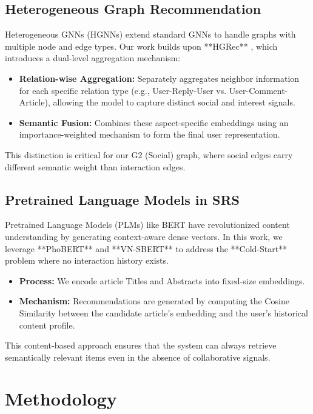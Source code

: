 \documentclass[11pt]{article}
\begin{document}
\subsection{Heterogeneous Graph Recommendation}
Heterogeneous GNNs (HGNNs) extend standard GNNs to handle graphs with multiple node and edge types. Our work builds upon **HGRec** \citet{shi2020hgrec}, which introduces a dual-level aggregation mechanism:
\begin{itemize}
  \item \textbf{Relation-wise Aggregation:} Separately aggregates neighbor information for each specific relation type (e.g., User-Reply-User vs. User-Comment-Article), allowing the model to capture distinct social and interest signals.
  \item \textbf{Semantic Fusion:} Combines these aspect-specific embeddings using an importance-weighted mechanism to form the final user representation.
\end{itemize}
This distinction is critical for our G2 (Social) graph, where social edges carry different semantic weight than interaction edges.

\subsection{Pretrained Language Models in SRS}
Pretrained Language Models (PLMs) like BERT \citet{devlin2018bert} have revolutionized content understanding by generating context-aware dense vectors. In this work, we leverage **PhoBERT** and **VN-SBERT** \citet{reimers2019sentence} to address the **Cold-Start** problem where no interaction history exists.
\begin{itemize}
  \item \textbf{Process:} We encode article Titles and Abstracts into fixed-size embeddings.
  \item \textbf{Mechanism:} Recommendations are generated by computing the Cosine Similarity between the candidate article's embedding and the user's historical content profile.
\end{itemize}
This content-based approach ensures that the system can always retrieve semantically relevant items even in the absence of collaborative signals.

\section{Methodology}
\end{document}
